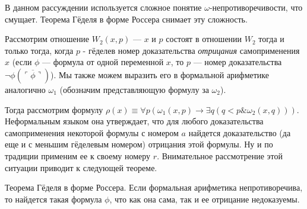 В данном рассуждении используется сложное понятие
$\omega$-непротиворечивости, что смущает. Теорема Гёделя в форме 
Россера снимает эту сложность.

Рассмотрим отношение $W_2 (x,p)$ --- $x$ и $p$ состоят в отношении $W_2$ тогда и только тогда, когда
$p$ - гёделев номер доказательства \emph{отрицания} самоприменения $x$ (если $\phi$ --- формула от
одной переменной $x$, то $p$ --- номер доказательства $\neg \phi(\overline{\ulcorner\phi\urcorner})$). 
Мы также можем выразить его в формальной арифметике аналогично $\omega_1$
(обозначим представляющую формулу за $\omega_2$).

Тогда рассмотрим формулу $\rho(x) \equiv \forall p (\omega_1 (x,p) \rightarrow \exists q (q < p \& \omega_2 (x,q)))$.
Неформальным языком она утверждает, что для любого доказательства самоприменения некоторой 
формулы с номером $a$ найдется доказательство (да еще и с меньшим гёделевым номером) 
отрицания этой формулы. Ну и по традиции применим ее к своему номеру $r$. 
Внимательное рассмотрение этой ситуации приводит к следующей теореме.

\begin{theorem}{Теорема Гёделя в форме Россера.}
Если формальная арифметика непротиворечива, то 
найдется такая формула $\phi$, что как она сама, так и ее отрицание
недоказуемы.
\end{theorem}

